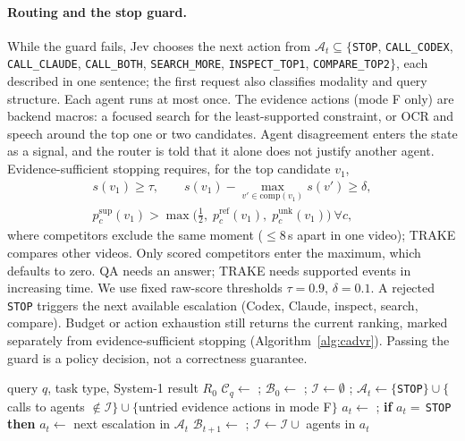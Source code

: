 \documentclass[runningheads]{llncs}
\newcommand{\act}[1]{\texttt{\small #1}}
\begin{document}
\paragraph{Routing and the stop guard.}
While the guard fails, Jev chooses the next action from $\mathcal{A}_t\subseteq\{$\act{STOP}, \act{CALL\_CODEX}, \act{CALL\_CLAUDE}, \act{CALL\_BOTH}, \act{SEARCH\_MORE}, \act{INSPECT\_TOP1}, \act{COMPARE\_TOP2}$\}$, each described in one sentence; the first request also classifies modality and query structure. Each agent runs at most once. The evidence actions (mode F only) are backend macros: a focused search for the least-supported constraint, or OCR and speech around the top one or two candidates. Agent disagreement enters the state as a signal, and the router is told that it alone does not justify another agent. Evidence-sufficient stopping requires, for the top candidate $v_1$,
\begin{equation}
\begin{gathered}
s(v_1)\geq\tau,\qquad s(v_1)-\max_{v'\in\mathrm{comp}(v_1)}s(v')\geq\delta,\\
p^{\mathrm{sup}}_c(v_1)>\max\bigl(\tfrac12,\;p^{\mathrm{ref}}_c(v_1),\;p^{\mathrm{unk}}_c(v_1)\bigr)\ \forall c,
\end{gathered}
\label{eq:stop}
\end{equation}
where competitors exclude the same moment ($\leq8$\,s apart in one video); TRAKE compares other videos. Only scored competitors enter the maximum, which defaults to zero. QA needs an answer; TRAKE needs supported events in increasing time. We use fixed raw-score thresholds $\tau=0.9$, $\delta=0.1$. A rejected \act{STOP} triggers the next available escalation (Codex, Claude, inspect, search, compare). Budget or action exhaustion still returns the current ranking, marked separately from evidence-sufficient stopping (Algorithm~\ref{alg:cadvr}). Passing the guard is a policy decision, not a correctness guarantee.

\begin{algorithm}[t]
\caption{CAD-VR controller for one query (6 steps, 40 tool calls, 240\,s).}
\label{alg:cadvr}
\small
\begin{algorithmic}[1]
\Require query $q$, task type, System-1 result $R_0$
\State $\mathcal{C}_q\gets$ ; $\mathcal{B}_0\gets$ ; $\mathcal{I}\gets\emptyset$ 
  \State {}; 
   \Return {}
  \EndIf
  \State $\mathcal{A}_t\gets\{$\act{STOP}$\}\cup\{$calls to agents $\notin\mathcal{I}\}\cup\{$untried evidence actions in mode F$\}$
  \State $a_t\gets$ ; \textbf{if} $a_t=$\,\act{STOP} \textbf{then} $a_t\gets$ next escalation in $\mathcal{A}_t$
  \If{$a_t=$\,\act{STOP}} \Return {}
  \EndIf
  \State $\mathcal{B}_{t+1}\gets$ ; $\mathcal{I}\gets\mathcal{I}\cup$ agents in $a_t$
\EndFor
\end{algorithmic}
\end{algorithm}
\end{document}

